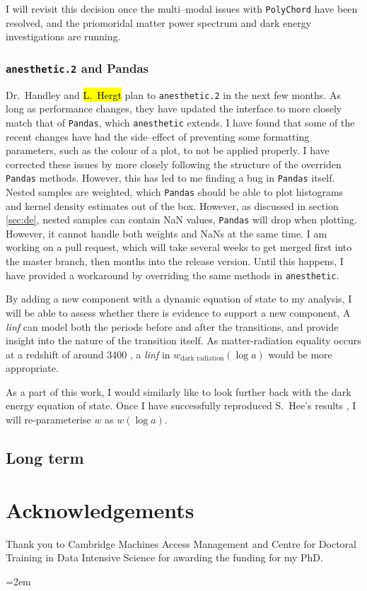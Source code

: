 \documentclass{article}
\begin{document}
I will revisit this decision once the multi--modal issues with \texttt{PolyChord} have been resolved, and the priomoridal matter power spectrum and dark energy investigations are running.

\subsubsection{\texttt{anesthetic.2} and {Pandas}}

Dr.~Handley and \hl{L.~Hergt} plan to \texttt{anesthetic.2} in the next few months. As long as performance changes, they have updated the interface to more closely match that of \texttt{Pandas}, which \texttt{anesthetic} extends. I have found that some of the recent changes have had the side--effect of preventing some formatting parameters, such as the colour of a plot, to not be applied properly. I have corrected these issues by more closely following the structure of the overriden \texttt{Pandas} methods. However, this has led to me finding a bug in \texttt{Pandas} itself. Nested samples are weighted, which \texttt{Pandas} should be able to plot histograms and kernel density estimates out of the box. However, as discussed in section \ref{sec:de}, nested samples can contain NaN values, \texttt{Pandas} will drop when plotting. However, it cannot handle both weights and NaNs at the same time. I am working on a pull request, which will take several weeks to get merged first into the master branch, then months into the release version. Until this happens, I have provided a workaround by overriding the same methods in \texttt{anesthetic}.

By adding a new component with a dynamic equation of state to my analysis, I will be able to assess whether there is evidence to support a new component, 
A \textit{linf} can model both the periods before and after the transitions, and provide insight into the nature of the transition itself. As matter-radiation equality occurs at a redshift of around 3400 \cite{planck_6}, a \textit{linf} in $w_\textrm{dark radiation}(\log{a})$ would be more appropriate. 


As a part of this work, I would similarly like to look further back with the dark energy equation of state. Once I have successfully reproduced S.~Hee's results \cite{Sonke}, I will re-parameterise $w$ as $w(\log{a})$.

\subsection{Long term}

\section{Acknowledgements}

Thank you to Cambridge Machines Access Management and Centre for Doctoral Training in Data Intensive Science for awarding the funding for my PhD.

\newpage
\emergencystretch=2em
\printbibliography
\end{document}
